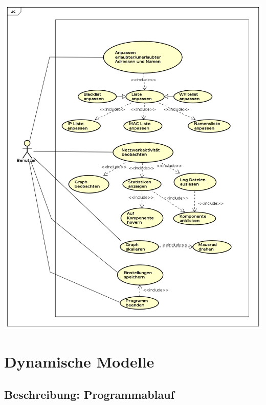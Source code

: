 \includegraphics[width=\textwidth]{../diagrams/UC_Benutzerinteraktion.png}


\pagebreak
\section{Dynamische Modelle}


	\subsection{Beschreibung: Programmablauf}
	
